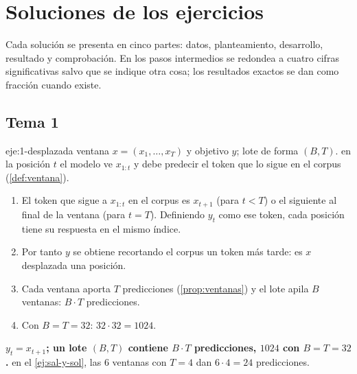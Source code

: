 \chapter{Soluciones de los ejercicios}
\label{ap:soluciones}

Cada solución se presenta en cinco partes: datos, planteamiento, desarrollo, resultado y comprobación. En los pasos intermedios se redondea a cuatro cifras significativas salvo que se indique otra cosa; los resultados exactos se dan como fracción cuando existe.

\section{Tema 1}

\begin{solucion}{eje:1-desplazada}
\datos ventana $x=(x_1,\dots,x_T)$ y objetivo $y$; lote de forma $(B,T)$.
\planteamiento en la posición $t$ el modelo ve $x_{1:t}$ y debe predecir el token que lo sigue en el corpus (\cref{def:ventana}).
\pasos
\begin{enumerate}[label=\arabic*.]
  \item El token que sigue a $x_{1:t}$ en el corpus es $x_{t+1}$ (para $t<T$) o el siguiente al final de la ventana (para $t=T$). Definiendo $y_t$ como ese token, cada posición tiene su respuesta en el mismo índice.
  \item Por tanto $y$ se obtiene recortando el corpus un token más tarde: es $x$ desplazada una posición.
  \item Cada ventana aporta $T$ predicciones (\cref{prop:ventanas}) y el lote apila $B$ ventanas: $B\cdot T$ predicciones.
  \item Con $B=T=32$: $32\cdot 32=1024$.
\end{enumerate}
\resultado \textbf{$y_t=x_{t+1}$; un lote $(B,T)$ contiene $B\cdot T$ predicciones, $1024$ con $B=T=32$.}
\comprobacion en el \cref{ej:sal-y-sol}, las 6 ventanas con $T=4$ dan $6\cdot 4=24$ predicciones.
\end{solucion}

